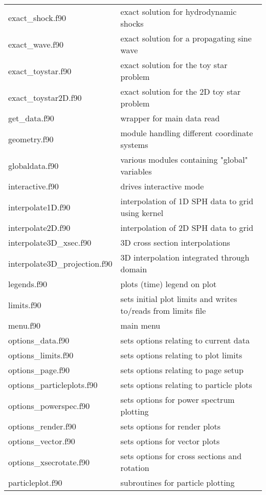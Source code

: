 \documentclass[a4paper,12pt]{article}
\begin{document}
\begin{longtable}{|lp{}|}
     exact\_shock.f90        & exact solution for hydrodynamic shocks\\
     exact\_wave.f90         & exact solution for a propagating sine wave\\
     exact\_toystar.f90      & exact solution for the toy star problem\\
     exact\_toystar2D.f90    & exact solution for the 2D toy star problem\\
     get\_data.f90           & wrapper for main data read\\
     geometry.f90           & module handling different coordinate systems\\
     globaldata.f90         & various modules containing "global" variables\\
     interactive.f90        & drives interactive mode\\
     interpolate1D.f90	 & interpolation of 1D SPH data to grid using kernel\\
     interpolate2D.f90	 & interpolation of 2D SPH data to grid     \\
     interpolate3D\_xsec.f90 & 3D cross section interpolations\\
     interpolate3D\_projection.f90	 & 3D interpolation integrated through domain\\
     legends.f90		       & plots (time) legend on plot\\
     limits.f90                   & sets initial plot limits and writes to/reads from limits file\\
     menu.f90               & main menu\\
     options\_data.f90       & sets options relating to current data\\
     options\_limits.f90     & sets options relating to plot limits\\
     options\_page.f90       & sets options relating to page setup\\
     options\_particleplots.f90 & sets options relating to particle plots\\
     options\_powerspec.f90  & sets options for power spectrum plotting\\
     options\_render.f90	 & sets options for render plots\\
     options\_vector.f90	 & sets options for vector plots\\
     options\_xsecrotate.f90 & sets options for cross sections and rotation\\
     particleplot.f90       & subroutines for particle plotting\\

\end{longtable}
\end{document}

